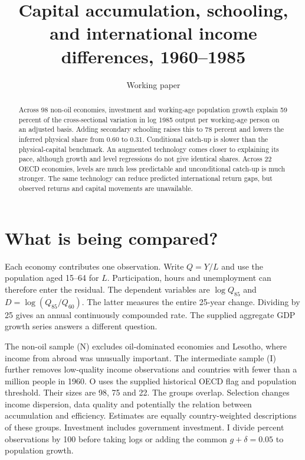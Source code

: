 \documentclass[11pt]{article}
\title{Capital accumulation, schooling, and international income differences, 1960--1985}
\author{Working paper}
\date{}
\begin{document}
\maketitle
\begin{abstract}
Across 98 non-oil economies, investment and working-age population growth explain 59 percent of the cross-sectional variation in log 1985 output per working-age person on an adjusted basis. Adding secondary schooling raises this to 78 percent and lowers the inferred physical share from 0.60 to 0.31. Conditional catch-up is slower than the physical-capital benchmark. An augmented technology comes closer to explaining its pace, although growth and level regressions do not give identical shares. Across 22 OECD economies, levels are much less predictable and unconditional catch-up is much stronger. The same technology can reduce predicted international return gaps, but observed returns and capital movements are unavailable.
\end{abstract}

\section{What is being compared?}
Each economy contributes one observation. Write $Q=Y/L$ and use the population aged 15--64 for $L$. Participation, hours and unemployment can therefore enter the residual. The dependent variables are $\log Q_{85}$ and $D=\log(Q_{85}/Q_{60})$. The latter measures the entire 25-year change. Dividing by 25 gives an annual continuously compounded rate. The supplied aggregate GDP growth series answers a different question.

The non-oil sample (N) excludes oil-dominated economies and Lesotho, where income from abroad was unusually important. The intermediate sample (I) further removes low-quality income observations and countries with fewer than a million people in 1960. O uses the supplied historical OECD flag and population threshold. Their sizes are 98, 75 and 22. The groups overlap. Selection changes income dispersion, data quality and potentially the relation between accumulation and efficiency. Estimates are equally country-weighted descriptions of these groups. Investment includes government investment. I divide percent observations by 100 before taking logs or adding the common $g+\delta=0.05$ to population growth.
\end{document}
